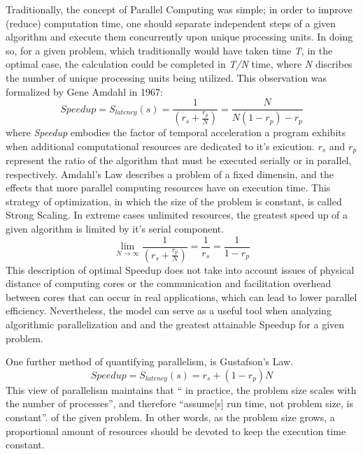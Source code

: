 Traditionally, the concept of Parallel Computing was simple; in order to improve
(reduce) computation time, one should separate independent steps of a given algorithm
and execute them concurrently upon unique processing units.  In doing so, for a given
problem, which traditionally would have taken time \textit{T}, in the optimal case,
the calculation could be completed in \textit{T/N} time, where \textit{N} discribes
the number of unique processing units being utilized.  This observation was formalized
by Gene Amdahl in 1967\cite{Wilt}:
%
\begin{equation}
  \tag{Amdahl's Law}
  Speedup = S_{latency}(s)= \frac{1}{(r_{s} + \frac{r_{p}}{N})} = \frac{N}{N(1-r_{p})-r_{p}}
  \label{egn:Amdahl}
\end{equation}
%
where \textit{Speedup} embodies the factor of temporal acceleration a program
exhibits when additional computational resources are dedicated to it's exicution.
 \textit{$r_{s}$} and \textit{$ r_{p} $} represent the ratio of the algorithm that must be executed serially or in parallel, respectively.  Amdahl's Law describes a problem of a fixed dimensin,
and the effects that more parallel computing resources have on execution time.
This strategy of optimization, in which the size of the problem is constant,
 is called Strong Scaling.
In extreme cases unlimited resources, the greatest speed up of a given algorithm
 is limited by it's serial component.
%
\begin{equation}
 \lim_{N\to\infty}  \frac{1}{(r_{s} + \frac{r_{p}}{N})} = \frac{1}{r_{s}} = \frac{1}{1-r_{p}}
\end{equation}
%
This description of optimal Speedup does not take into account issues of physical
distance of computing cores or the communication and facilitation overhead between
cores that can occur in real applications, which can lead to lower parallel efficiency.
Nevertheless, the model can serve as a useful tool when analyzing algorithmic parallelization and and the greatest
attainable Speedup for a given problem.\par

  One further method of quantifying parallelism, is Gustafson's Law\cite{Gustafson}.
%
\begin{equation}
  \tag{Gustofson's Law}
  Speedup = S_{latency}(s) = r_{s} + (1 - r_{p})N
\end{equation}
%
This view of parallelism maintains that `` in practice, the problem
size scales with the number of processes'', and therefore
``assume[s] run time, not problem size, is constant''.
of the given problem. In other words, as the problem size grows, a proportional
amount of resources should be devoted to keep the execution time constant.

